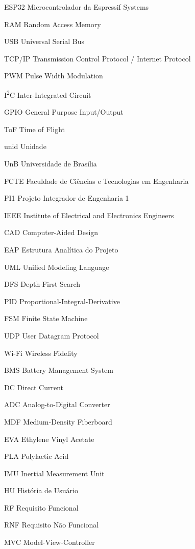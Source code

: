 \begin{siglas}
  \item[ESP32] Microcontrolador da Espressif Systems
  \item[RAM] Random Access Memory
  \item[USB] Universal Serial Bus
  \item[TCP/IP] Transmission Control Protocol / Internet Protocol
  \item[PWM] Pulse Width Modulation
  \item[I\textsuperscript{2}C] Inter-Integrated Circuit
  \item[GPIO] General Purpose Input/Output
  \item[ToF] Time of Flight
  \item[unid] Unidade
  \item[UnB] Universidade de Brasília
  \item[FCTE] Faculdade de Ciências e Tecnologias em Engenharia
  \item[PI1] Projeto Integrador de Engenharia 1
  \item[IEEE] Institute of Electrical and Electronics Engineers
  \item[CAD] Computer-Aided Design
  \item[EAP] Estrutura Analítica do Projeto
  \item[UML] Unified Modeling Language
  \item[DFS] Depth-First Search
  \item[PID] Proportional-Integral-Derivative
  \item[FSM] Finite State Machine
  \item[UDP] User Datagram Protocol
  \item[Wi-Fi] Wireless Fidelity
  \item[BMS] Battery Management System
  \item[DC] Direct Current
  \item[ADC] Analog-to-Digital Converter
  \item[MDF] Medium-Density Fiberboard
  \item[EVA] Ethylene Vinyl Acetate
  \item[PLA] Polylactic Acid
  \item[IMU] Inertial Measurement Unit
  \item[HU] História de Usuário
  \item[RF] Requisito Funcional
  \item[RNF] Requisito Não Funcional
  \item[MVC] Model-View-Controller

\end{siglas}

